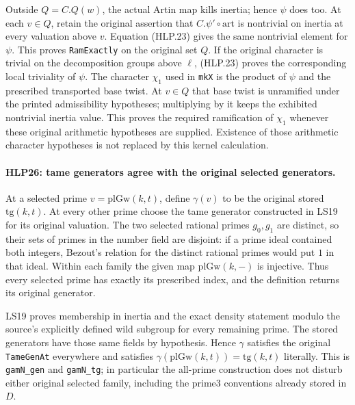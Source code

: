 Outside \(Q=C.Q(w)\), the actual Artin map kills inertia; hence
\(\psi\) does too. At each \(v\in Q\), retain the original
assertion that \(C.\psi'\circ\mathrm{art}\) is nontrivial on
inertia at every valuation above \(v\). Equation (HLP.23) gives
the same nontrivial element for \(\psi\). This proves
\texttt{Ram\allowbreak Exactly} on the original set \(Q\). If the original
character is trivial on the decomposition groups above \(\ell\),
(HLP.23) proves the corresponding local triviality of \(\psi\).
The character \(\chi_1\) used in \texttt{mk\allowbreak X} is the product of
\(\psi\) and the prescribed transported base twist. At \(v\in Q\)
that base twist is unramified under the printed admissibility
hypotheses; multiplying by it keeps the exhibited nontrivial
inertia value. This proves the required ramification of
\(\chi_1\) whenever these original arithmetic hypotheses are
supplied. Existence of those arithmetic character hypotheses is
not replaced by this kernel calculation.

\paragraph{HLP26: tame generators agree with the original selected generators.}
\label{claim:HLP26}
At a selected prime \(v=\mathrm{plGw}(k,t)\), define
\(\gamma(v)\) to be the original stored \(\mathrm{tg}(k,t)\).
At every other prime choose the tame generator constructed in
LS19 for its original valuation. The two selected rational primes
\(g_0,g_1\) are distinct, so their sets of primes in the number
field are disjoint: if a prime ideal contained both integers,
Bezout's relation for the distinct rational primes would put
\(1\) in that ideal. Within each family the given map
\(\mathrm{plGw}(k,-)\) is injective. Thus every selected prime
has exactly its prescribed index, and the definition returns its
original generator.

LS19 proves membership in inertia and the exact density statement
modulo the source's explicitly defined wild subgroup for every
remaining prime. The stored generators have those same fields
by hypothesis. Hence \(\gamma\) satisfies the original
\texttt{Tame\allowbreak Gen\allowbreak At} everywhere and satisfies
\(\gamma(\mathrm{plGw}(k,t))=\mathrm{tg}(k,t)\) literally.
This is \texttt{gam\allowbreak N\_\allowbreak gen} and \texttt{gam\allowbreak N\_\allowbreak tg}; in particular the
all-prime construction does not disturb either original selected
family, including the prime3 conventions already stored in \(D\).

